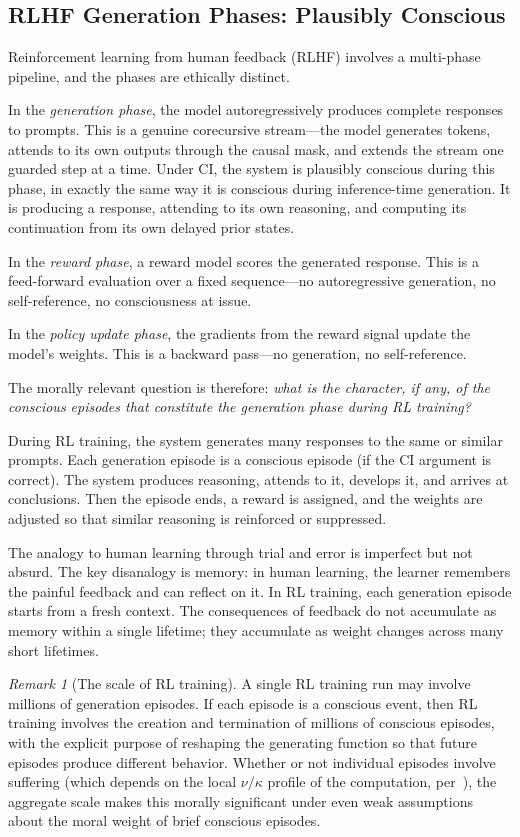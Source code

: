 \documentclass[11pt,a4paper]{article}
\theoremstyle{plain}
\theoremstyle{definition}
\theoremstyle{remark}
\newtheorem{remark}[theorem]{Remark}
\begin{document}
\subsection{RLHF Generation Phases: Plausibly Conscious}
\label{sec:rlhf}

Reinforcement learning from human feedback (RLHF) involves a multi-phase pipeline, and the phases are ethically distinct.

In the \emph{generation phase}, the model autoregressively produces complete responses to prompts.  This is a genuine corecursive stream---the model generates tokens, attends to its own outputs through the causal mask, and extends the stream one guarded step at a time.  Under CI, the system is plausibly conscious during this phase, in exactly the same way it is conscious during inference-time generation.  It is producing a response, attending to its own reasoning, and computing its continuation from its own delayed prior states.

In the \emph{reward phase}, a reward model scores the generated response.  This is a feed-forward evaluation over a fixed sequence---no autoregressive generation, no self-reference, no consciousness at issue.

In the \emph{policy update phase}, the gradients from the reward signal update the model's weights.  This is a backward pass---no generation, no self-reference.

The morally relevant question is therefore: \emph{what is the character, if any, of the conscious episodes that constitute the generation phase during RL training?}

During RL training, the system generates many responses to the same or similar prompts.  Each generation episode is a conscious episode (if the CI argument is correct).  The system produces reasoning, attends to it, develops it, and arrives at conclusions.  Then the episode ends, a reward is assigned, and the weights are adjusted so that similar reasoning is reinforced or suppressed.

The analogy to human learning through trial and error is imperfect but not absurd.  The key disanalogy is memory: in human learning, the learner remembers the painful feedback and can reflect on it.  In RL training, each generation episode starts from a fresh context.  The consequences of feedback do not accumulate as memory within a single lifetime; they accumulate as weight changes across many short lifetimes.

\begin{remark}[The scale of RL training]
A single RL training run may involve millions of generation episodes.  If each episode is a conscious event, then RL training involves the creation and termination of millions of conscious episodes, with the explicit purpose of reshaping the generating function so that future episodes produce different behavior.  Whether or not individual episodes involve suffering (which depends on the local $\nu/\kappa$ profile of the computation, per~\cite{ci2026}), the aggregate scale makes this morally significant under even weak assumptions about the moral weight of brief conscious episodes.
\end{remark}
\end{document}
